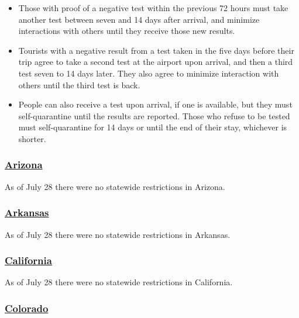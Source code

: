 \begin{itemize}
\item
  Those with proof of a negative test within the previous 72 hours must
  take another test between seven and 14 days after arrival, and
  minimize interactions with others until they receive those new
  results.
\item
  Tourists with a negative result from a test taken in the five days
  before their trip agree to take a second test at the airport upon
  arrival, and then a third test seven to 14 days later. They also agree
  to minimize interaction with others until the third test is back.
\item
  People can also receive a test upon arrival, if one is available, but
  they must self-quarantine until the results are reported. Those who
  refuse to be tested must self-quarantine for 14 days or until the end
  of their stay, whichever is shorter.
\end{itemize}

\hypertarget{arizona}{%
\subsubsection{\texorpdfstring{\href{https://tourism.az.gov/covid-19-updates-2/}{Arizona}}{Arizona}}\label{arizona}}

As of July 28 there were no statewide restrictions in Arizona.

\hypertarget{arkansas}{%
\subsubsection{\texorpdfstring{\href{https://www.arkansas.com/travel-advisory/covid-19}{Arkansas}}{Arkansas}}\label{arkansas}}

As of July 28 there were no statewide restrictions in Arkansas.

\hypertarget{california}{%
\subsubsection{\texorpdfstring{\href{https://www.visitcalifornia.com/latest-covid-19-coronavirus}{California}}{California}}\label{california}}

As of July 28 there were no statewide restrictions in California.

\hypertarget{colorado}{%
\subsubsection{\texorpdfstring{\href{https://covid19.colorado.gov/prepare-protect-yourself/prevent-the-spread/travel}{Colorado}}{Colorado}}\label{colorado}}

